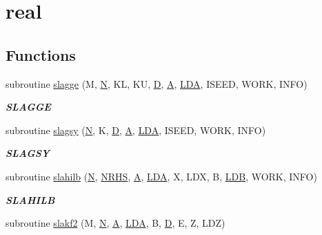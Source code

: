 \hypertarget{group__real__matgen}{}\section{real}
\label{group__real__matgen}
\subsection*{Functions}
\begin{DoxyCompactItemize}
\item 
subroutine \hyperlink{group__real__matgen_gaf0a706a38b6c86c926c695f46ab79238}{slagge} (M, \hyperlink{polmisc_8c_a0240ac851181b84ac374872dc5434ee4}{N}, K\+L, K\+U, \hyperlink{odrpack_8h_a7dae6ea403d00f3687f24a874e67d139}{D}, \hyperlink{classA}{A}, \hyperlink{example__user_8c_ae946da542ce0db94dced19b2ecefd1aa}{L\+D\+A}, I\+S\+E\+E\+D, W\+O\+R\+K, I\+N\+F\+O)
\begin{DoxyCompactList}\small\item\em {\bfseries S\+L\+A\+G\+G\+E} \end{DoxyCompactList}\item 
subroutine \hyperlink{group__real__matgen_ga5a9f8dec609201d836f0d7be30819977}{slagsy} (\hyperlink{polmisc_8c_a0240ac851181b84ac374872dc5434ee4}{N}, K, \hyperlink{odrpack_8h_a7dae6ea403d00f3687f24a874e67d139}{D}, \hyperlink{classA}{A}, \hyperlink{example__user_8c_ae946da542ce0db94dced19b2ecefd1aa}{L\+D\+A}, I\+S\+E\+E\+D, W\+O\+R\+K, I\+N\+F\+O)
\begin{DoxyCompactList}\small\item\em {\bfseries S\+L\+A\+G\+S\+Y} \end{DoxyCompactList}\item 
subroutine \hyperlink{group__real__matgen_ga143acfd9b7157658b8e2582fc6673e53}{slahilb} (\hyperlink{polmisc_8c_a0240ac851181b84ac374872dc5434ee4}{N}, \hyperlink{example__user_8c_aa0138da002ce2a90360df2f521eb3198}{N\+R\+H\+S}, \hyperlink{classA}{A}, \hyperlink{example__user_8c_ae946da542ce0db94dced19b2ecefd1aa}{L\+D\+A}, X, L\+D\+X, B, \hyperlink{example__user_8c_a50e90a7104df172b5a89a06c47fcca04}{L\+D\+B}, W\+O\+R\+K, I\+N\+F\+O)
\begin{DoxyCompactList}\small\item\em {\bfseries S\+L\+A\+H\+I\+L\+B} \end{DoxyCompactList}\item 
subroutine \hyperlink{group__real__matgen_ga2b9000ce75fc048e922106a3ff84b51e}{slakf2} (M, \hyperlink{polmisc_8c_a0240ac851181b84ac374872dc5434ee4}{N}, \hyperlink{classA}{A}, \hyperlink{example__user_8c_ae946da542ce0db94dced19b2ecefd1aa}{L\+D\+A}, B, \hyperlink{odrpack_8h_a7dae6ea403d00f3687f24a874e67d139}{D}, E, Z, L\+D\+Z)

\end{DoxyCompactItemize}
